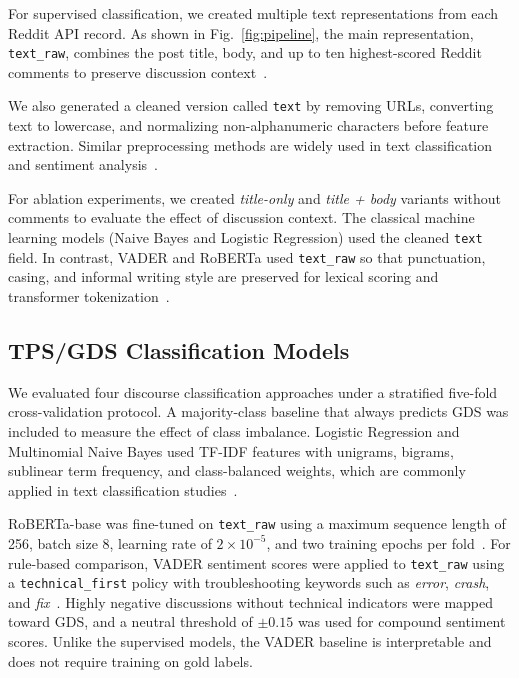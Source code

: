 \documentclass[conference]{IEEEtran}
\begin{document}
For supervised classification, we created multiple text representations from each Reddit API record. As shown in Fig.~\ref{fig:pipeline}, the main representation, \texttt{text\_raw}, combines the post title, body, and up to ten highest-scored Reddit comments to preserve discussion context~\cite{du2021,wen2014sentiment}.

We also generated a cleaned version called \texttt{text} by removing URLs, converting text to lowercase, and normalizing non-alphanumeric characters before feature extraction. Similar preprocessing methods are widely used in text classification and sentiment analysis~\cite{yoo2015classification}.

For ablation experiments, we created \textit{title-only} and \textit{title + body} variants without comments to evaluate the effect of discussion context. The classical machine learning models (Naive Bayes and Logistic Regression) used the cleaned \texttt{text} field. In contrast, VADER and RoBERTa used \texttt{text\_raw} so that punctuation, casing, and informal writing style are preserved for lexical scoring and transformer tokenization~\cite{hutto2014,liu2019roberta}.

\subsection{TPS/GDS Classification Models}

We evaluated four discourse classification approaches under a stratified five-fold cross-validation protocol. A majority-class baseline that always predicts GDS was included to measure the effect of class imbalance. Logistic Regression and Multinomial Naive Bayes used TF-IDF features with unigrams, bigrams, sublinear term frequency, and class-balanced weights, which are commonly applied in text classification studies~\cite{yoo2015classification}. 

RoBERTa-base was fine-tuned on \texttt{text\_raw} using a maximum sequence length of 256, batch size 8, learning rate of \(2\times10^{-5}\), and two training epochs per fold~\cite{liu2019roberta}. For rule-based comparison, VADER sentiment scores were applied to \texttt{text\_raw} using a \texttt{technical\_first} policy with troubleshooting keywords such as \textit{error}, \textit{crash}, and \textit{fix}~\cite{hutto2014}. Highly negative discussions without technical indicators were mapped toward GDS, and a neutral threshold of \(\pm0.15\) was used for compound sentiment scores. Unlike the supervised models, the VADER baseline is interpretable and does not require training on gold labels.
\end{document}

